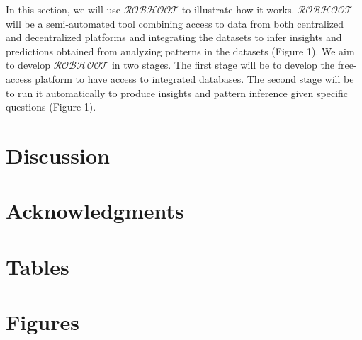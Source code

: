 \documentclass[english,12pt]{article}
\begin{document}
In this section, we will use $\mathcal{ROBHOOT}$ to illustrate how it
works. $\mathcal{ROBHOOT}$ will be a semi-automated tool combining
access to data from both centralized and decentralized platforms and
integrating the datasets to infer insights and predictions obtained
from analyzing patterns in the datasets (Figure 1). We aim to develop
$\mathcal{ROBHOOT}$ in two stages. The first stage will be to develop
the free-access platform to have access to integrated databases. The
second stage will be to run it automatically to produce insights and
pattern inference given specific questions (Figure 1). 

\section{Discussion}


\newpage
\section{Acknowledgments}


\newpage



\newpage

\section{Tables}


\newpage

\section{Figures}





\printindex
\end{document}
